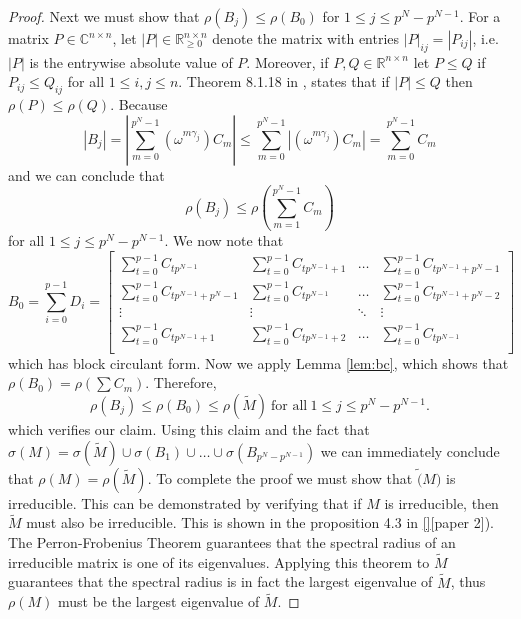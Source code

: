 \documentclass[preprint,12pt]{elsarticle}
\theoremstyle{definition}
\theoremstyle{remark}
\begin{document}
\begin{proof}
Next we must show that $\rho(B_j)\leq\rho(B_0)$ for $1\leq j \leq p^N-p^{N-1}$. For a matrix $P\in\mathbb{C}^{n\times n}$, let $|P|\in\mathbb{R}_{\geq 0}^{n\times n}$ denote the matrix with entries $|P|_{ij}=|P_{ij}|$, i.e. $|P|$ is the entrywise absolute value of $P$. Moreover, if $P,Q\in\mathbb{R}^{n\times n}$ let $P\leq Q$ if $P_{ij}\leq Q_{ij}$ for all $1\leq i,j\leq n$. Theorem 8.1.18 in \cite{Horn85}, states that if $|P|\leq Q$  then $\rho(P)\leq\rho(Q)$. Because
$$\left| {{B_j}} \right| = \left| {\sum\limits_{m = 0}^{p^N - 1} {{{\left( {{\omega ^{m\gamma_j}}} \right)}}{C_m}} } \right| \leq \sum\limits_{m = 0}^{p^N - 1} {\left| {\left( {{\omega ^{m\gamma_j}}} \right){C_m}} \right|}  = \sum\limits_{m = 0}^{p^N - 1} {{C_m}} $$ and we can conclude that $$\rho(B_j)\leq\rho\left(\sum_{m=1}^{p^N-1}C_m\right)$$ for all $1\leq j\leq p^N-p^{N-1}$. We now note that $$B_0=\sum_{i=0}^{p-1}D_i=
\left[\begin{matrix}
\sum_{t=0}^{p-1}C_{tp^{N-1}} & \sum_{t=0}^{p-1}C_{tp^{N-1}+1} & \dots & \sum_{t=0}^{p-1}C_{tp^{N-1}+p^N-1}\\
\sum_{t=0}^{p-1}C_{tp^{N-1}+p^N-1} & \sum_{t=0}^{p-1}C_{tp^{N-1}} & \dots & \sum_{t=0}^{p-1}C_{tp^{N-1}+p^N-2}\\
\vdots & \vdots & \ddots & \vdots\\
\sum_{t=0}^{p-1}C_{tp^{N-1}+1} & \sum_{t=0}^{p-1}C_{tp^{N-1}+2} & \dots & \sum_{t=0}^{p-1}C_{tp^{N-1}}\\
\end{matrix}\right]$$ which has block circulant form.  Now we apply Lemma \ref{lem:bc}, which shows that $\rho(B_0)=\rho\left(\sum C_m\right)$. Therefore,
\begin{equation}\label{eq:rho}
\rho(B_j)\leq\rho(B_0)\leq\rho(\tilde{M}) \ \text{for all} \ 1\leq j\leq p^N-p^{N-1}.
\end{equation}
which verifies our claim.  Using this claim and the fact that $\sigma(M)=\sigma(\tilde{M})\cup\sigma(B_1)\cup\dots\cup\sigma(B_{p^N-p^{N-1}})$ we can immediately conclude that $\rho(M)=\rho(\tilde{M})$.  To complete the proof we must show that $\tilde(M)$ is irreducible.  This can be demonstrated by verifying that if $M$ is irreducible, then $\tilde{M}$ must also be irreducible. This is shown in the proposition 4.3 in \ref{}[paper 2]). The Perron-Frobenius Theorem guarantees that the spectral radius of an irreducible matrix is one of its eigenvalues. Applying this theorem to $\tilde{M}$ guarantees that the spectral radius is in fact the largest eigenvalue of $\tilde{M}$, thus $\rho(M)$ must be the largest eigenvalue of $\tilde{M}$.


\end{proof}
\end{document}
